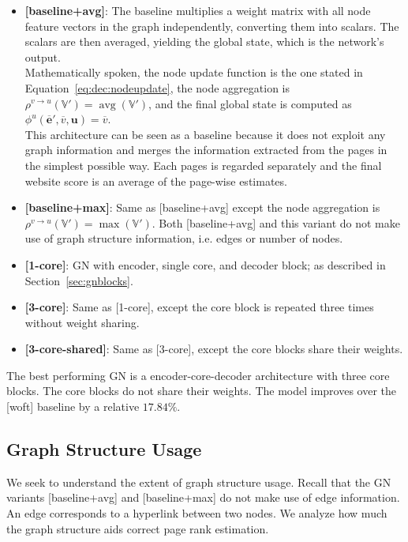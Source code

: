 \begin{itemize}
    \item \textbf{[baseline+avg]}: The baseline multiplies a weight matrix with all node feature vectors in the graph independently, converting them into scalars. The scalars are then averaged, yielding the global state, which is the network's output.\\
    Mathematically spoken, the node update function is the one stated in Equation~\ref{eq:dec:nodeupdate}, the node aggregation is $\rho^{v\rightarrow u}\left(\mathbb{V}'\right)=\operatorname{avg}\left(\mathbb{V}'\right)$, and the final global state is computed as $\phi^u\left(\bm{\overline{e}}',\overline{v},\bm{u}\right)=\overline{v}$.\\
    This architecture can be seen as a baseline because it does not exploit any graph information and merges the information extracted from the pages in the simplest possible way. Each pages is regarded separately and the final website score is an average of the page-wise estimates.
    \item \textbf{[baseline+max]}: Same as [baseline+avg] except the node aggregation is $\rho^{v\rightarrow u}\left(\mathbb{V}'\right)=\operatorname{max}\left(\mathbb{V}'\right)$. Both [baseline+avg] and this variant do not make use of graph structure information, i.e. edges or number of nodes.
    \item \textbf{[1-core]}: GN with encoder, single core, and decoder block; as described in Section~\ref{sec:gnblocks}.
    \item \textbf{[3-core]}: Same as [1-core], except the core block is repeated three times without weight sharing.
    \item \textbf{[3-core-shared]}: Same as [3-core], except the core blocks share their weights.
\end{itemize}

The best performing GN is a encoder-core-decoder architecture with three core blocks. The core blocks do not share their weights. The model improves over the [woft] baseline by a relative $17.84\%$.

\subsection{Graph Structure Usage}
\label{sec:graphstructureusage}

We seek to understand the extent of graph structure usage. Recall that the GN variants [baseline+avg] and [baseline+max] do not make use of edge information. An edge corresponds to a hyperlink between two nodes. We analyze how much the graph structure aids correct page rank estimation.

